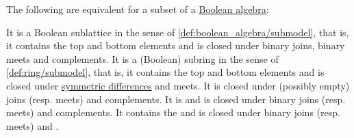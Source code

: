 \begin{proposition}\label{thm:boolean_subalgebra}
  The following are equivalent for a subset of a \hyperref[def:boolean_algebra]{Boolean algebra}:
  \begin{thmenum}
     It is a Boolean sublattice in the sense of \cref{def:boolean_algebra/submodel}, that is, it contains the top and bottom elements and is closed under binary joins, binary meets and complements.
     It is a (Boolean) subring in the sense of \cref{def:ring/submodel}, that is, it contains the top and bottom elements and is closed under \hyperref[def:symmetric_difference]{symmetric differences} and meets.
     It is closed under (possibly empty)  joins (resp. meets) and complements.
     It is  and is closed under binary joins (resp. meets) and complements.
     It contains the  and is closed under binary joins (resp. meets) and \hyperref[def:boolean_algebra_difference]{}.
  \end{thmenum}
\end{proposition}
